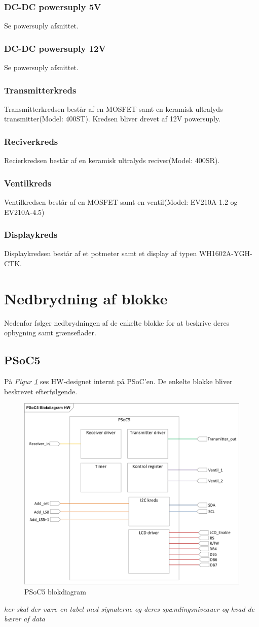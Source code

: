 \subsubsection{DC-DC powersuply 5V}
Se powersuply afsnittet.
\subsubsection{DC-DC powersuply 12V}
Se powersuply afsnittet.
\subsubsection{Transmitterkreds}
Transmitterkredsen består af en MOSFET samt en keramisk ultralyds transmitter(Model: 400ST). Kredsen bliver drevet af 12V powersuply. 
\subsubsection{Reciverkreds}
Recierkredsen består af en keramisk ultralyds reciver(Model: 400SR).
\subsubsection{Ventilkreds}
Ventilkredsen består af en MOSFET samt en ventil(Model: EV210A-1.2 og EV210A-4.5)
\subsubsection{Displaykreds}
Displaykredsen består af et potmeter samt et display af typen WH1602A-YGH-CTK.
\section{Nedbrydning af blokke}
Nedenfor følger nedbrydningen af de enkelte blokke for at beskrive deres opbygning samt grænseflader.
\subsection{PSoC5}
På \textit{Figur \ref{fig:PSoCBlok}} ses HW-designet internt på PSoC'en. De enkelte blokke bliver beskrevet efterfølgende.
\begin{figure}[H]
\centering
\includegraphics[width=.75\textwidth]{billeder/PSoCBlock}
\caption{PSoC5 blokdiagram}
\label{fig:PSoCBlok}
\end{figure}
\textit{her skal der være en tabel med signalerne og deres spændingsniveauer og hvad de bærer af data}
